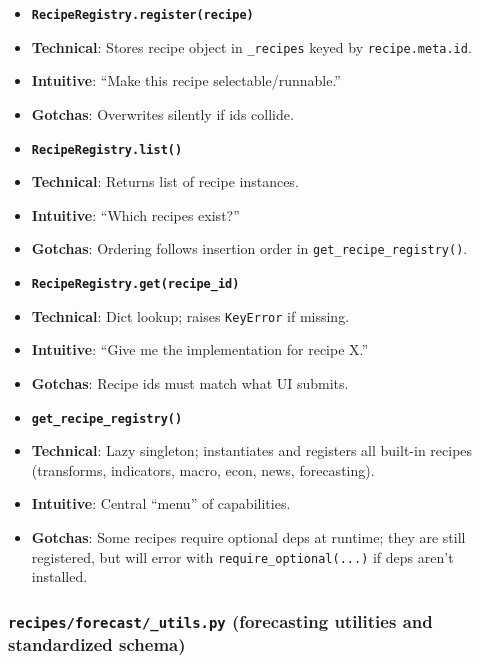 \documentclass[11pt]{article}
\begin{document}
\begin{itemize}[leftmargin=*,nosep]
\item \textbf{\texttt{RecipeRegistry.register(recipe)}}
\item \textbf{Technical}: Stores recipe object in \texttt{\_recipes} keyed by \texttt{recipe.meta.id}.
\item \textbf{Intuitive}: “Make this recipe selectable/runnable.”
\item \textbf{Gotchas}: Overwrites silently if ids collide.
\item \textbf{\texttt{RecipeRegistry.list()}}
\item \textbf{Technical}: Returns list of recipe instances.
\item \textbf{Intuitive}: “Which recipes exist?”
\item \textbf{Gotchas}: Ordering follows insertion order in \texttt{get\_recipe\_registry()}.
\item \textbf{\texttt{RecipeRegistry.get(recipe\_id)}}
\item \textbf{Technical}: Dict lookup; raises \texttt{KeyError} if missing.
\item \textbf{Intuitive}: “Give me the implementation for recipe X.”
\item \textbf{Gotchas}: Recipe ids must match what UI submits.
\item \textbf{\texttt{get\_recipe\_registry()}}
\item \textbf{Technical}: Lazy singleton; instantiates and registers all built-in recipes (transforms, indicators, macro, econ, news, forecasting).
\item \textbf{Intuitive}: Central “menu” of capabilities.
\item \textbf{Gotchas}: Some recipes require optional deps at runtime; they are still registered, but will error with \texttt{require\_optional(...)} if deps aren’t installed.
\end{itemize}


\subsubsection{\texttt{recipes/forecast/\_utils.py} (forecasting utilities and standardized schema)}
\end{document}
